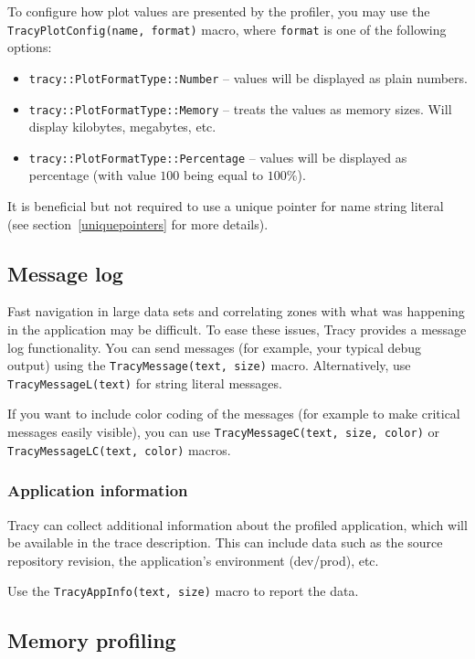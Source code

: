 \documentclass[hidelinks,titlepage,a4paper]{article}
\begin{document}
To configure how plot values are presented by the profiler, you may use the \texttt{TracyPlotConfig(name, format)} macro, where \texttt{format} is one of the following options:

\begin{itemize}
\item \texttt{tracy::PlotFormatType::Number} -- values will be displayed as plain numbers.
\item \texttt{tracy::PlotFormatType::Memory} -- treats the values as memory sizes. Will display kilobytes, megabytes, etc.
\item \texttt{tracy::PlotFormatType::Percentage} -- values will be displayed as percentage (with value $100$ being equal to $100\%$).
\end{itemize}

It is beneficial but not required to use a unique pointer for name string literal (see section~\ref{uniquepointers} for more details).

\subsection{Message log}
\label{messagelog}

Fast navigation in large data sets and correlating zones with what was happening in the application may be difficult. To ease these issues, Tracy provides a message log functionality. You can send messages (for example, your typical debug output) using the \texttt{TracyMessage(text, size)} macro. Alternatively, use \texttt{TracyMessageL(text)} for string literal messages.

If you want to include color coding of the messages (for example to make critical messages easily visible), you can use \texttt{TracyMessageC(text, size, color)} or \texttt{TracyMessageLC(text, color)} macros.

\subsubsection{Application information}
\label{appinfo}

Tracy can collect additional information about the profiled application, which will be available in the trace description. This can include data such as the source repository revision, the application's environment (dev/prod), etc.

Use the \texttt{TracyAppInfo(text, size)} macro to report the data.

\subsection{Memory profiling}
\label{memoryprofiling}
\end{document}
